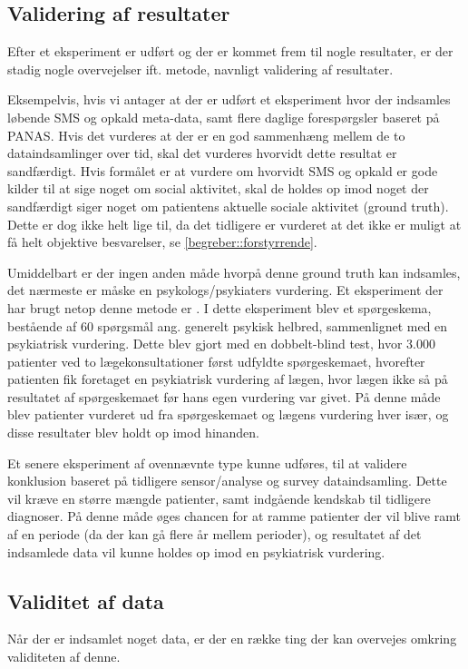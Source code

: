 \subsection{Validering af resultater}
Efter et eksperiment er udført og der er kommet frem til nogle resultater, er der stadig nogle overvejelser ift. metode, navnligt validering af resultater.

Eksempelvis, hvis vi antager at der er udført et eksperiment hvor der indsamles løbende SMS og opkald meta-data, samt flere daglige forespørgsler baseret på PANAS.
Hvis det vurderes at der er en god sammenhæng mellem de to dataindsamlinger over tid, skal det vurderes hvorvidt dette resultat er sandfærdigt.
Hvis formålet er at vurdere om hvorvidt SMS og opkald er gode kilder til at sige noget om social aktivitet, skal de holdes op imod noget der sandfærdigt siger noget om patientens aktuelle sociale aktivitet (ground truth).
Dette er dog ikke helt lige til, da det tidligere er vurderet at det ikke er muligt at få helt objektive besvarelser, se \cref{begreber::forstyrrende}.

Umiddelbart er der ingen anden måde hvorpå denne ground truth kan indsamles, det nærmeste er måske en psykologs/psykiaters vurdering.
Et eksperiment der har brugt netop denne metode er \citet{goldberg}.
I dette eksperiment blev et spørgeskema, bestående af 60 spørgsmål ang. generelt psykisk helbred, sammenlignet med en psykiatrisk vurdering.
Dette blev gjort med en dobbelt-blind test, hvor 3.000 patienter ved to lægekonsultationer først udfyldte spørgeskemaet, hvorefter patienten fik foretaget en psykiatrisk vurdering af lægen, hvor lægen ikke så på resultatet af spørgeskemaet før hans egen vurdering var givet.
På denne måde blev patienter vurderet ud fra spørgeskemaet og lægens vurdering hver især, og disse resultater blev holdt op imod hinanden.

Et senere eksperiment af ovennævnte type kunne udføres, til at validere konklusion baseret på tidligere sensor/analyse og survey dataindsamling.
Dette vil kræve en større mængde patienter, samt indgående kendskab til tidligere diagnoser.
På denne måde øges chancen for at ramme patienter der vil blive ramt af en periode (da der kan gå flere år mellem perioder), og resultatet af det indsamlede data vil kunne holdes op imod en psykiatrisk vurdering.

\subsection{Validitet af data}
Når der er indsamlet noget data, er der en række ting der kan overvejes omkring validiteten af denne.

